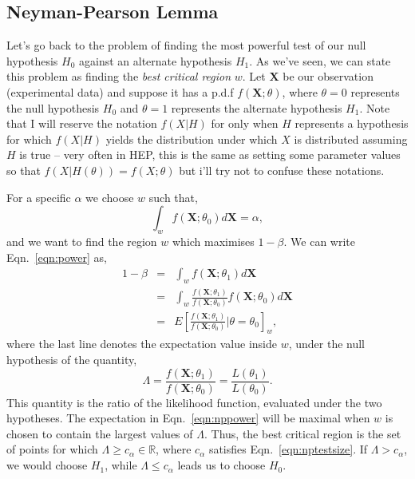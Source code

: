 \subsection{Neyman-Pearson Lemma}
Let's go back to the problem of finding the most powerful test of our null hypothesis $H_0$ against an alternate hypothesis $H_1$. As we've seen, we can state this problem as finding the \emph{best critical region} $w$. Let $\mathbf{X}$ be our observation (experimental data) and suppose it has a p.d.f $f(\mathbf{X};\theta)$, where $\theta=0$ represents the null hypothesis $H_0$ and $\theta=1$ represents the alternate hypothesis $H_1$. Note that I will reserve the notation $f(X|H)$ for only when $H$ represents a hypothesis for which $f(X|H)$ yields the distribution under which $X$ is distributed assuming $H$ is true -- very often in HEP, this is the same as setting some parameter values so that $f(X|H(\theta))=f(X;\theta)$ but i'll try not to confuse these notations. 

For a specific $\alpha$ we choose $w$ such that,
\begin{equation}\label{eqn:nptestsize}
    \int_{w}f(\mathbf{X};\theta_0)d\mathbf{X} = \alpha,
\end{equation}
and we want to find the region $w$ which maximises $1-\beta$. We can write Eqn.~\ref{eqn:power} as, 
\begin{eqnarray}\label{eqn:nppower}
    1-\beta & = &\int_{w}f(\mathbf{X};\theta_1)d\mathbf{X}\\
            & = &\int_{w}\frac{f(\mathbf{X};\theta_1)}{f(\mathbf{X};\theta_0)}f(\mathbf{X};\theta_0)d\mathbf{X}\\ 
            & = & E\left[\frac{f(\mathbf{X};\theta_1)}{f(\mathbf{X};\theta_0)}\bigg|\theta=\theta_0\right]_{w},
\end{eqnarray}
where the last line denotes the expectation value inside $w$, under the null hypothesis of the quantity,
\begin{equation}
\Lambda=\dfrac{f(\mathbf{X};\theta_1)}{f(\mathbf{X};\theta_0)}=\dfrac{L(\theta_1)}{L(\theta_0)}.
\end{equation}
This quantity is the ratio of the likelihood function, evaluated under the two hypotheses. The expectation in Eqn.~\ref{eqn:nppower} will be maximal when $w$ is chosen to contain the largest values of $\Lambda$. Thus, the best critical region is the set of points for which $\Lambda \geq c_{\alpha}\in \mathbb{R}$, where $c_{\alpha}$ satisfies Eqn.~\ref{eqn:nptestsize}. If $\Lambda>c_{\alpha}$, we would choose $H_{1}$, while $\Lambda \leq c_{\alpha}$ leads us to choose $H_0$. 


